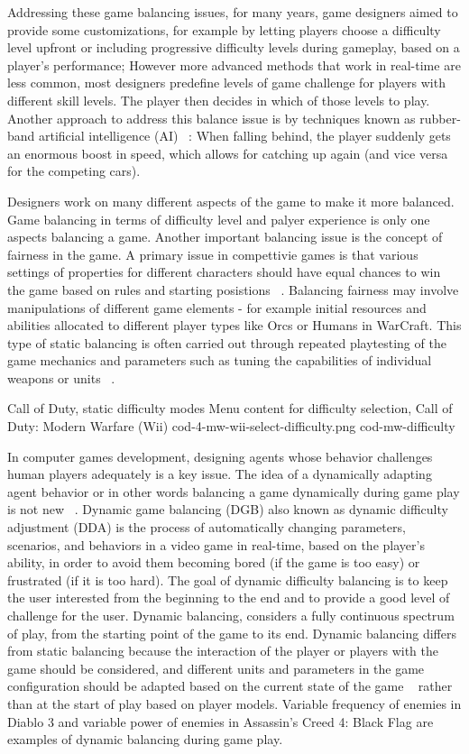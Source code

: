Addressing these game balancing issues, for many years, game designers aimed to provide some customizations, for example by letting players choose a difficulty level upfront or including progressive difficulty levels during gameplay, based on a player's performance; However more advanced methods that work in real-time are less common, most designers predefine levels of game challenge for players with different skill levels. The player then decides in which of those levels to play. Another approach to address this balance issue is by techniques known as rubber-band artificial intelligence (AI) ~\cite{champandard2003ai}: When falling behind, the player suddenly gets an enormous boost in speed, which allows for catching up again (and vice versa for the competing cars).

Designers work on many different aspects of the game to make it more balanced. Game balancing in terms of difficulty level and palyer experience is only one aspects balancing a game. Another important balancing issue is the concept of fairness in the game. A primary issue in compettivie games is that various settings of properties for different characters should have equal chances to win the game based on rules and starting posistions ~\cite{rollings2003andrew}. Balancing fairness may involve manipulations of different game elements - for example initial resources and abilities allocated to different player  types like Orcs or Humans in WarCraft. This type of static balancing is often carried out through repeated playtesting of the game mechanics and parameters such as tuning the capabilities of individual weapons or units ~\cite{boll2003paper, rollings2003andrew}.

\largeimg
{Call of Duty, static difficulty modes}
{Menu content for difficulty selection, Call of Duty: Modern Warfare (Wii)}
{cod-4-mw-wii-select-difficulty.png}
{cod-mw-difficulty}

In computer games development, designing agents whose behavior challenges human players adequately is a key issue. The idea of a dynamically adapting agent behavior or in other words balancing a game dynamically during game play is not new ~\cite{andrade2005automatic}. Dynamic game balancing (DGB) also known as dynamic difficulty adjustment (DDA) is the process of automatically changing parameters, scenarios, and behaviors in a video game in real-time, based on the player's ability, in order to avoid them becoming bored (if the game is too easy) or frustrated (if it is too hard). The goal of dynamic difficulty balancing is to keep the user interested from the beginning to the end and to provide a good level of challenge for the user. Dynamic balancing, considers a fully continuous spectrum of play, from the starting point of the game to its end. Dynamic balancing differs from static balancing because the interaction of the player or players with the game should be considered, and different units and parameters in the game configuration should be adapted based on the current state of the game ~\cite{tan2011dynamic} rather than at the start of play based on player models. Variable frequency of enemies in Diablo 3 and variable power of enemies in Assassin's Creed 4: Black Flag are examples of dynamic balancing during game play.

